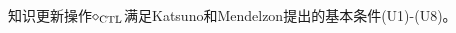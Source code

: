 \documentclass[9pt, CJK]{beamer}
\begin{document}
\begin{frame}
{{		\begin{theorem}\label{thm:U1toU8}
			知识更新操作$\diamond_{\textrm{CTL}}$满足Katsuno和Mendelzon提出的基本条件(U1)-(U8)。
		\end{theorem}
	}
	}
\end{frame}

%	
	
\end{document}
